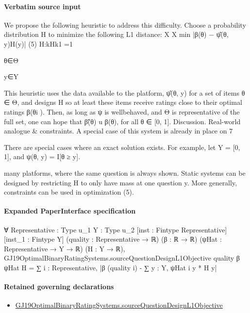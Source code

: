 \documentclass[10pt]{article}
\begin{document}
\paragraph{Verbatim source input}
\begin{ReviewVerbatim}
We propose the following heuristic to address this
difficulty. Choose a probability distribution H to
minimize the following L1 distance:
X
X
min
|β(θ) −
ψ̂(θ, y)H(y)|
(5)
H:kHk1 =1

θ∈Θ

y∈Y

This heuristic uses the data available to the platform, ψ̂(θ, y) for a set of items θ ∈ Θ, and designs H
so at least these items receive ratings close to their
optimal ratings β(θi ). Then, as long as ψ is wellbehaved, and Θ is representative of the full set, one
can hope that β̃(θ) u β(θ), for all θ ∈ [0, 1].
Discussion. Real-world analogue & constraints. A
special case of this system is already in place on
7

There are special cases where an exact solution exists. For example, let Y = [0, 1], and ψ(θ, y) = I[θ ≥ y].

many platforms, where the same question is always
shown. Static systems can be designed by restricting
H to only have mass at one question y. More generally, constraints can be used in optimization (5).
\end{ReviewVerbatim}



\paragraph{Expanded PaperInterface specification}
\begin{ReviewVerbatim}
∀ {Representative : Type u_1} {Y : Type u_2} [inst : Fintype Representative] [inst_1 : Fintype Y]
  (quality : Representative → ℝ) (β : ℝ → ℝ) (ψHat : Representative → Y → ℝ) (H : Y → ℝ),
  GJ19OptimalBinaryRatingSystems.sourceQuestionDesignL1Objective quality β ψHat H =
    ∑ i : Representative, |β (quality i) - ∑ y : Y, ψHat i y * H y|
\end{ReviewVerbatim}

\paragraph{Retained governing declarations}
\begin{itemize}\raggedright
\item \hyperlink{governing-declaration-8728e19191fdf2da}{GJ19\allowbreak{}Optimal\allowbreak{}Binary\allowbreak{}Rating\allowbreak{}Systems.\allowbreak{}source\allowbreak{}Question\allowbreak{}Design\allowbreak{}L1\allowbreak{}Objective}
\end{itemize}
\end{document}

